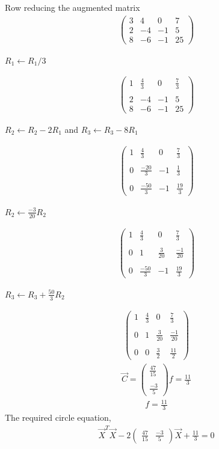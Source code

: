 \documentclass[journal,12pt,twocolumn]{IEEEtran}
\newcommand{\myvec}[1]{\ensuremath{\begin{pmatrix}#1\end{pmatrix}}}
\begin{document}
Row reducing the augmented matrix
\begin{align}
\myvec{3 & 4 & 0 & 7\\
2 & -4 & -1 & 5 \\
8 & -6 & -1 & 25}
\end{align}
\begin{center}
$R_1\leftarrow R_1/3$
\end{center}
\begin{align}
\myvec{1 & \frac{4}{3} & 0 & \frac{7}{3}\\ \\
2 & -4 & -1 & 5 \\ 
8 & -6 & -1 & 25}
\end{align}
\begin{center}
$R_2\leftarrow R_2 - 2R_1   $ and
$R_3\leftarrow R_3 - 8R_1$
\end{center}
\begin{align}
\myvec{1 & \frac{4}{3} & 0 & \frac{7}{3}\\ \\
0 & \frac{-20}{3} & -1 & \frac{1}{3} \\ \\
0 & \frac{-50}{3} & -1 & \frac{19}{3}}
\end{align}
\begin{center}
$R_2\leftarrow \frac{-3}{20}R_2   $
\end{center}
\begin{align}
\myvec{1 & \frac{4}{3} & 0 & \frac{7}{3}\\ \\
0 & 1 & \frac{3}{20} & \frac{-1}{20} \\ \\
0 & \frac{-50}{3} & -1 & \frac{19}{3}}
\end{align}
\begin{center}
$R_3\leftarrow R_3 + \frac{50}{3}R_2   $
\end{center}
\begin{align}
\myvec{1 & \frac{4}{3} & 0 & \frac{7}{3}\\ \\
0 & 1 & \frac{3}{20} & \frac{-1}{20} \\ \\
0 & 0 & \frac{3}{2} & \frac{11}{2}}
\end{align}
\begin{align}
\vec{C} = \myvec{\frac{47}{15}  \\ \\ \frac{-3}{5} }
f = \frac{11}{3}
\end{align}
\begin{align}
f = \frac{11}{3}
\end{align}
The required circle equation,
\begin{align}
\vec{X}^T\vec{X}-2\myvec{\frac{47}{15} & \frac{-3}{5} }\vec{X} + \frac{11}{3} = 0
\end{align}
\end{document}
